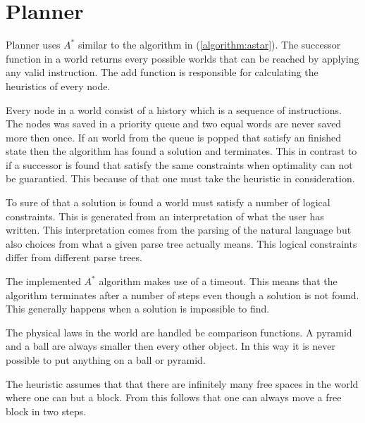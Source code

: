 \section{Planner}
Planner uses $A^*$ similar to the algorithm in (\ref{algorithm:astar}). The
successor function in a world returns every possible worlds that can be reached
by applying any valid instruction. The add function is responsible for
calculating the heuristics of every node.

Every node in a world consist of a history which is a sequence of instructions. 
The nodes was saved in a priority queue and two equal words are never saved more
then once. If an world from the queue is popped that satisfy an finished state
then the algorithm has found a solution and terminates. This in contrast to if a
successor is found that satisfy the same constraints when optimality can not be
guarantied. This because of that one must take the heuristic in consideration.   

To sure of that a solution is found a world must satisfy a number of logical
constraints. This is generated from an interpretation of what the user has
written. This interpretation comes from the parsing of the natural language but 
also choices from what a given parse tree actually means. This logical
constraints differ from different parse trees.   

The implemented $A^*$ algorithm makes use of a timeout. This means that 
the algorithm terminates after a number of steps even though a solution is not
found. This generally happens when a solution is impossible to find.

The physical laws in the world are handled be comparison functions. A pyramid
and a ball are always smaller then every other object. In this way it is never
possible to put anything on a ball or pyramid. 

The heuristic assumes that that there are infinitely many free spaces in the
world where one can but a block. From this follows that one can always move a
free block in two steps. 


